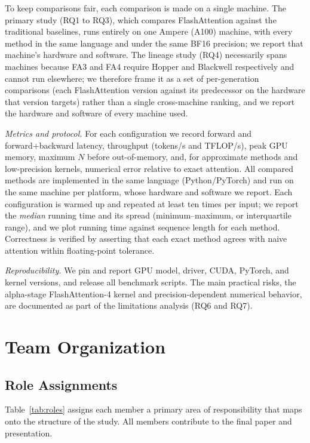 \documentclass[sigconf,nonacm]{acmart}
\newcommand{\lead}[1]{\textit{#1}\quad}
\begin{document}
To keep comparisons fair, each comparison is made on a single machine. The
primary study (RQ1 to RQ3), which compares FlashAttention against the traditional
baselines, runs entirely on one Ampere (A100) machine, with every method in the
same language and under the same BF16 precision; we report that machine's
hardware and software. The lineage study (RQ4) necessarily spans machines because
FA3 and FA4 require Hopper and Blackwell respectively and cannot run elsewhere; we
therefore frame it as a set of per-generation comparisons (each FlashAttention
version against its predecessor on the hardware that version targets) rather than
a single cross-machine ranking, and we report the hardware and software of every
machine used.

\lead{Metrics and protocol.}
For each configuration we record forward and forward+backward latency, throughput
(tokens/s and TFLOP/s), peak GPU memory, maximum $N$ before out-of-memory,
and, for approximate methods and low-precision kernels, numerical error
relative to exact attention. All compared methods are implemented in the same
language (Python/PyTorch) and run on the same machine per platform, whose
hardware and software we report. Each configuration is warmed up and repeated at
least ten times per input; we report the \emph{median} running time and its
spread (minimum--maximum, or interquartile range), and we plot running time
against sequence length for each method. Correctness is verified by asserting
that each exact method agrees with naive attention within floating-point
tolerance.

\lead{Reproducibility.}
We pin and report GPU model, driver, CUDA, PyTorch, and kernel versions, and
release all benchmark scripts. The main practical risks, the alpha-stage
FlashAttention-4 kernel and precision-dependent numerical behavior, are
documented as part of the limitations analysis (RQ6 and RQ7).

\section{Team Organization}
\label{sec:team}

\subsection{Role Assignments}
Table~\ref{tab:roles} assigns each member a primary area of responsibility that
maps onto the structure of the study. All members contribute to the final paper
and presentation.
\end{document}
